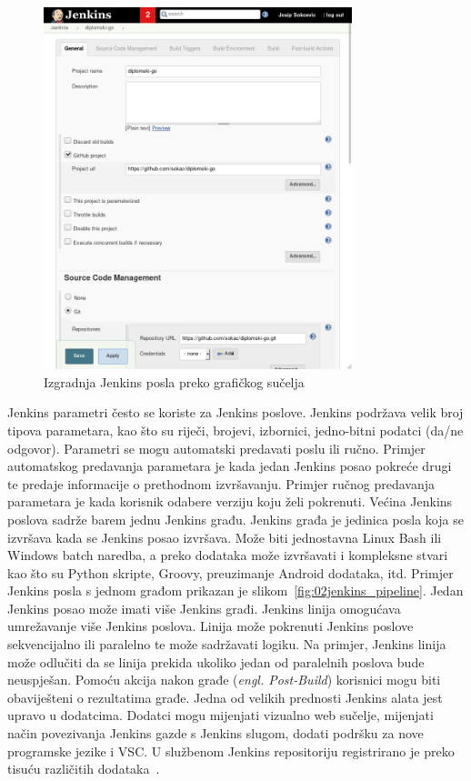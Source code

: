 \begin{figure}[h]
    \centering
    \includegraphics[width=0.8\textwidth]{img/02/jenkins_job.png}
    \caption{Izgradnja Jenkins posla preko grafičkog sučelja}%
    \label{fig:02jenkinsjob}
\end{figure}

Jenkins parametri često se koriste za Jenkins poslove. Jenkins podržava velik broj tipova
parametara, kao što su riječi, brojevi, izbornici, jedno-bitni podatci (da/ne odgovor). Parametri se
mogu automatski predavati poslu ili ručno. Primjer automatskog predavanja parametara je kada jedan
Jenkins posao pokreće drugi te predaje informacije o prethodnom izvršavanju. Primjer ručnog
predavanja parametara je kada korisnik odabere verziju koju želi pokrenuti. Većina Jenkins poslova
sadrže barem jednu Jenkins građu. Jenkins građa je jedinica posla koja se izvršava kada se Jenkins
posao izvršava. Može biti jednostavna Linux Bash ili Windows batch naredba, a preko dodataka može
izvršavati i kompleksne stvari kao što su Python skripte, Groovy, preuzimanje Android dodataka, itd.
Primjer Jenkins posla s jednom građom prikazan je slikom~\ref{fig:02jenkins_pipeline}. Jedan
Jenkins posao može imati više Jenkins građi. Jenkins linija omogućava umrežavanje više Jenkins
poslova. Linija može pokrenuti Jenkins poslove sekvencijalno ili paralelno te može sadržavati
logiku. Na primjer, Jenkins linija može odlučiti da se linija prekida ukoliko jedan od paralelnih
poslova bude neuspješan. Pomoću akcija nakon građe (\textit{engl. Post-Build}) korisnici mogu biti
obaviješteni o rezultatima građe. Jedna od velikih prednosti Jenkins alata jest upravo u dodatcima.
Dodatci mogu mijenjati vizualno web sučelje, mijenjati način povezivanja Jenkins gazde s Jenkins
slugom, dodati podršku za nove programske jezike i VSC. U službenom Jenkins repositoriju
registrirano je preko tisuću različitih dodataka~\citep{JenkisPlugins}.

